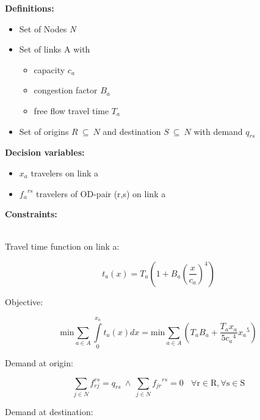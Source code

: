 \documentclass[a4paper, 12pt]{article}
\begin{document}
\vspace{5mm}
\noindent
\begin{large}\textbf{Definitions:}\end{large}
\begin{itemize}
\item Set of Nodes \textit{N}
\item Set of links A with
\begin{itemize}
\item capacity $c_{a}$
\item congestion factor $B_{a}$
\item free flow travel time $T_{a}$
\end{itemize}
\item Set of origins $R\ \subseteq\ N$ and destination $S\ \subseteq\ N$ with demand $q_{rs}$ 
\end{itemize}
\begin{large}\textbf{Decision variables:}\end{large}
\begin{itemize}
\item $x_{a}$ travelers on link a
\item ${f_{a}}^{rs}$ travelers of OD-pair (r,s) on link a
\end{itemize}
\begin{large}\textbf{Constraints:}\end{large}\\
Travel time function on link a: 
\begin{large}
\boldmath\begin{equation*}
t_{a}\left(x\right) = T_{a}\left(1+B_{a}\left(\frac{x}{c_a}\right)^4\right)
\end{equation*}
\end{large}
Objective:
\begin{large}
\boldmath\begin{equation*}
\mathrm{min}\sum_{a\in{A}} \int\limits_{0}^{x_a}t_{a}\left(x\right)dx = \mathrm{min}\sum_{a\in{A}}\left(T_{a}B_{a}+\frac{T_{a}x_{a}}{5{c_{a}}^4}{x_{a}}^5\right) 
\end{equation*}
\end{large}
Demand at origin: 
\begin{large}
\boldmath\begin{equation*}
\sum_{j\in{N}} f_{rj}^{rs} = q_{rs}\  \wedge \ \sum_{j\in{N}} {f_{jr}}^{rs} = 0 \ \ \ \ \mathrm{\forall{r}\in{R},\forall{s}\in{S}} 
\end{equation*}
\end{large}
Demand at destination: 
\end{document}
